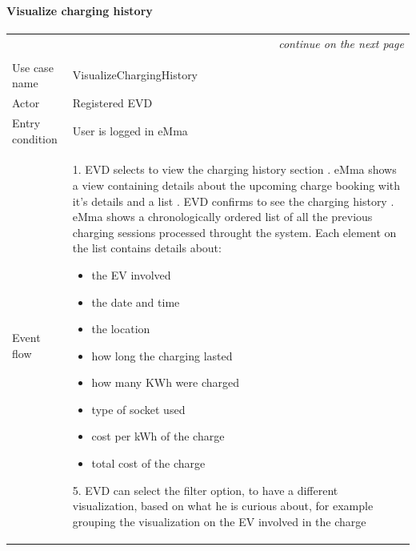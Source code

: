 \paragraph{Visualize charging history}
\begin{center}
    \begin{longtable}{p{4cm} p{11cm}}
    \multicolumn{2}{r}{\itshape{continue on the next page}}\\
    \endfoot 
    \\
    \endlastfoot
    \hline
     Use case name &  VisualizeChargingHistory\\
     \hline
     Actor & Registered EVD \\
     \hline
     Entry condition & User is logged in eMma  \\
     \hline
     Event flow & 
        1. EVD selects to view the charging history section \newline
        2. eMma shows a view containing details about the upcoming charge booking with it's details and a list \newline
        3. EVD confirms to see the charging history \newline
        4. eMma shows a chronologically ordered list of all the previous charging sessions processed throught the system. Each element on the list contains details about:
            \begin{adjustwidth}{0.5cm}{}
                \begin{itemize}
                    \item the EV involved %
                    \item the date and time
                    \item the location
                    \item how long the charging lasted
                    \item how many KWh were charged
                    \item type of socket used
                    \item cost per kWh of the charge
                    \item total cost of the charge
                \end{itemize}
            \end{adjustwidth}
        5. EVD can select the filter option, to have a different visualization, based on what he is curious about, for example grouping the visualization on the EV involved in the charge \newline

\end{longtable}
\end{center}
